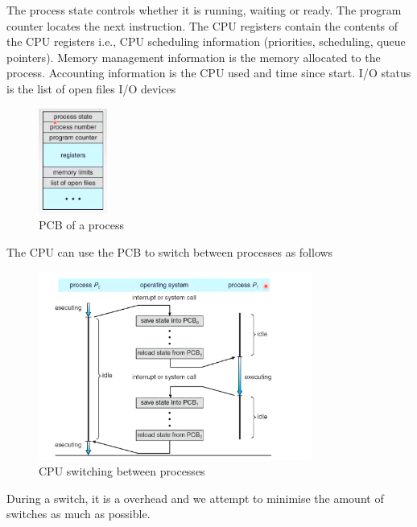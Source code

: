 \documentclass[a4paper]{article}
\theoremstyle{plain}
\theoremstyle{definition}
\newtheorem{defn}{Definition}[section]
\theoremstyle{remark}
\begin{document}
\begin{tcolorbox}[colback=black!3!white,colframe=black!60!white,title=\begin{defn}Process Control Block (PCB) \label{Process Control Block (PCB)}\end{defn}]
The process state controls whether it is running, waiting or ready. The program counter locates the next instruction. The CPU registers contain the contents of the CPU registers i.e., CPU scheduling information (priorities, scheduling, queue pointers). Memory management information is the memory allocated to the process. Accounting information is the CPU used and time since start. I/O status is the list of open files I/O devices
\begin{figure}[H]
	\centering
	\includegraphics[width=0.2\textwidth]{six.png}
	\caption{PCB of a process}
	\label{fig:six-png}
\end{figure}
The CPU can use the PCB to switch between processes as follows
\begin{figure}[H]
	\centering
	\includegraphics[width=0.8\textwidth]{seven.png}
	\caption{CPU switching between processes}
	\label{fig:seven-png}
\end{figure}
During a switch, it is a overhead and we attempt to minimise the amount of switches as much as possible.
\end{tcolorbox}
\end{document}
